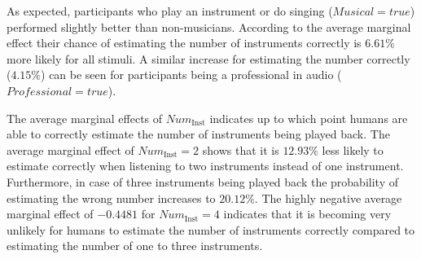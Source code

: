 As expected, participants who play an instrument or do singing ($\textit{Musical} = true$) performed slightly better than non-musicians. According to the average marginal effect their chance of estimating the number of instruments correctly is $6.61\%$ more likely for all stimuli. A similar increase for estimating the number correctly ($4.15\%$) can be seen for participants being a professional in audio ($\textit{Professional} = true$).

The average marginal effects of $\textit{Num}_{\mathrm{Inst}}$ indicates up to which point humans are able to correctly estimate the number of instruments being played back. The average marginal effect of $\textit{Num}_{\mathrm{Inst}} = 2$ shows that it is $12.93\%$ less likely to estimate correctly when listening to two instruments instead of one instrument. Furthermore, in case of three instruments being played back the probability of estimating the wrong number increases to $20.12\%$. The highly negative average marginal effect of $-0.4481$ for $\textit{Num}_{\mathrm{Inst}} = 4$ indicates that it is becoming very unlikely for humans to estimate the number of instruments correctly compared to estimating the number of one to three instruments.

